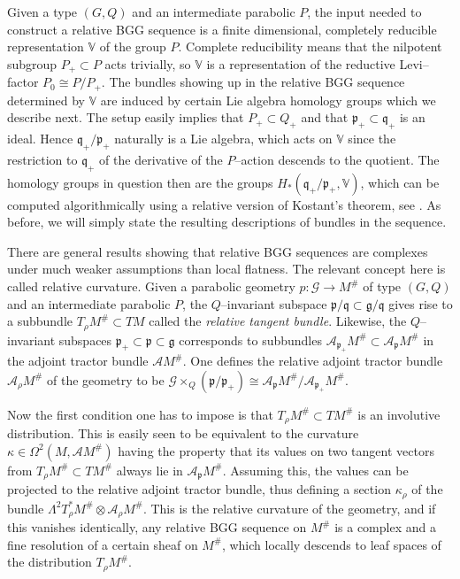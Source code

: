 \documentclass[12pt,a4paper]{amsart}
\def\frak{\mathfrak}
\def\Bbb{\mathbb}
\def\Cal{\mathcal}
\newcommand{\x}{\times}
\newcommand{\ka}{\kappa}
\newcommand{\La}{\Lambda}
\newcommand{\Om}{\Omega}
\newcounter{theorem}
\numberwithin{theorem}{section}
\theoremstyle{definition}
\theoremstyle{remark}
\begin{document}
Given a type $(G,Q)$ and an intermediate parabolic $P$, the input
needed to construct a relative BGG sequence is a finite dimensional,
completely reducible representation $\Bbb V$ of the group
$P$. Complete reducibility means that the nilpotent subgroup
$P_+\subset P$ acts trivially, so $\Bbb V$ is a representation of the
reductive Levi--factor $P_0\cong P/P_+$. The bundles showing up in the
relative BGG sequence determined by $\Bbb V$ are induced by certain
Lie algebra homology groups which we describe next. The setup easily
implies that $P_+\subset Q_+$ and that $\frak p_+\subset\frak q_+$ is
an ideal. Hence $\frak q_+/\frak p_+$ naturally is a Lie algebra,
which acts on $\Bbb V$ since the restriction to $\frak q_+$ of the
derivative of the $P$--action descends to the quotient. The homology
groups in question then are the groups $H_*(\frak q_+/\frak p_+,\Bbb
V)$, which can be computed algorithmically using a relative version of
Kostant's theorem, see \cite{Rel-BGG1}. As before, we will simply
state the resulting descriptions of bundles in the sequence.

There are general results showing that relative BGG sequences are
complexes under much weaker assumptions than local flatness. The
relevant concept here is called relative curvature. Given a parabolic
geometry $p:\Cal G\to M^\#$ of type $(G,Q)$ and an intermediate
parabolic $P$, the $Q$--invariant subspace $\frak p/\frak
q\subset\frak g/\frak q$ gives rise to a subbundle $T_\rho M^\#\subset
TM$ called the \textit{relative tangent bundle}. Likewise, the
$Q$--invariant subspaces $\frak p_+\subset \frak p\subset\frak g$
corresponds to subbundles $\Cal A_{\frak p_+}M^\#\subset\Cal A_{\frak
  p}M^\#$ in the adjoint tractor bundle $\Cal AM^\#$. One defines the
relative adjoint tractor bundle $\Cal A_{\rho}M^\#$ of the geometry to
be $\Cal G\x_Q(\frak p/\frak p_+)\cong \Cal A_{\frak p}M^\#/\Cal
A_{\frak p_+}M^\#$.

Now the first condition one has to impose is that $T_\rho M^\#\subset
TM^\#$ is an involutive distribution. This is easily seen to be
equivalent to the curvature $\ka\in\Om^2(M,\Cal AM^\#)$ having the
property that its values on two tangent vectors from $T_\rho
M^\#\subset TM^\#$ always lie in $\Cal A_{\frak p}M^\#$. Assuming
this, the values can be projected to the relative adjoint tractor
bundle, thus defining a section $\ka_{\rho}$ of the bundle
$\La^2T_\rho^*M^\#\otimes\Cal A_\rho M^\#$. This is the relative
curvature of the geometry, and if this vanishes identically, any
relative BGG sequence on $M^\#$ is a complex and a fine resolution of
a certain sheaf on $M^\#$, which locally descends to leaf spaces of
the distribution $T_\rho M^\#$.
\end{document}
